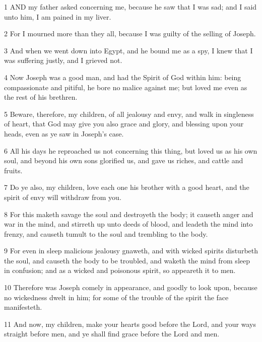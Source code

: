 \par 1 AND my father asked concerning me, because he saw that I was sad; and I said unto him, I am pained in my liver.

\par 2 For I mourned more than they all, because I was guilty of the selling of Joseph.

\par 3 And when we went down into Egypt, and he bound me as a spy, I knew that I was suffering justly, and I grieved not.

\par 4 Now Joseph was a good man, and had the Spirit of God within him: being compassionate and pitiful, he bore no malice against me; but loved me even as the rest of his brethren.

\par 5 Beware, therefore, my children, of all jealousy and envy, and walk in singleness of heart, that God may give you also grace and glory, and blessing upon your heads, even as ye saw in Joseph's case.

\par 6 All his days he reproached us not concerning this thing, but loved us as his own soul, and beyond his own sons glorified us, and gave us riches, and cattle and fruits.

\par 7 Do ye also, my children, love each one his brother with a good heart, and the spirit of envy will withdraw from you.

\par 8 For this maketh savage the soul and destroyeth the body; it causeth anger and war in the mind, and stirreth up unto deeds of blood, and leadeth the mind into frenzy, and causeth tumult to the soul and trembling to the body.

\par 9 For even in sleep malicious jealousy gnaweth, and with wicked spirits disturbeth the soul, and causeth the body to be troubled, and waketh the mind from sleep in confusion; and as a wicked and poisonous spirit, so appeareth it to men.

\par 10 Therefore was Joseph comely in appearance, and goodly to look upon, because no wickedness dwelt in him; for some of the trouble of the spirit the face manifesteth.

\par 11 And now, my children, make your hearts good before the Lord, and your ways straight before men, and ye shall find grace before the Lord and men.

